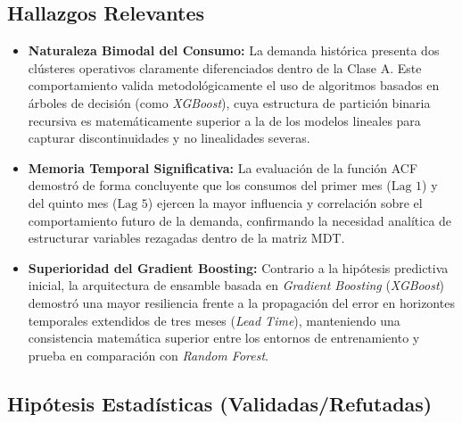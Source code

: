 \documentclass[conference,twoside]{IEEEtran}
\begin{document}
\subsection{Hallazgos Relevantes}
\label{subsec:hallazgos_relevantes}

\begin{itemize}
    \item \textbf{Naturaleza Bimodal del Consumo:} La demanda histórica presenta dos clústeres operativos claramente diferenciados dentro de la Clase A. Este comportamiento valida metodológicamente el uso de algoritmos basados en árboles de decisión (como \textit{XGBoost}), cuya estructura de partición binaria recursiva es matemáticamente superior a la de los modelos lineales para capturar discontinuidades y no linealidades severas.
    \item \textbf{Memoria Temporal Significativa:} La evaluación de la función ACF demostró de forma concluyente que los consumos del primer mes ($\text{Lag } 1$) y del quinto mes ($\text{Lag } 5$) ejercen la mayor influencia y correlación sobre el comportamiento futuro de la demanda, confirmando la necesidad analítica de estructurar variables rezagadas dentro de la matriz MDT.
    \item \textbf{Superioridad del Gradient Boosting:} Contrario a la hipótesis predictiva inicial, la arquitectura de ensamble basada en \textit{Gradient Boosting} (\textit{XGBoost}) demostró una mayor resiliencia frente a la propagación del error en horizontes temporales extendidos de tres meses (\textit{Lead Time}), manteniendo una consistencia matemática superior entre los entornos de entrenamiento y prueba en comparación con \textit{Random Forest}.
\end{itemize}

\subsection{Hipótesis Estadísticas (Validadas/Refutadas)}
\label{subsec:hipotesis_estadisticas}
\end{document}
